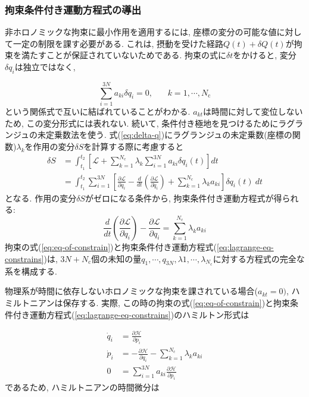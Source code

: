 \subsubsection{拘束条件付き運動方程式の導出}
非ホロノミックな拘束に最小作用を適用するには, 座標の変分の可能な値に対して一定の制限を課す必要がある. これは, 摂動を受けた経路$Q(t) + \delta Q(t)$が拘束を満たすことが保証されていないためである. 
拘束の式に$\delta t$をかけると, 変分$\delta q_{i}$は独立ではなく, 

\begin{equation}
  \sum_{i = 1}^{3N} a_{ki} \delta q_{i} = 0, ~~~~~~~~ k = 1,\cdots, N_{\mathrm{c}}
  \label{eq:delta-q}
\end{equation}
という関係式で互いに結ばれていることがわかる. 
$a_{kt}$は時間に対して変位しないため, この変分形式には表れない. 
続いて, 条件付き極地を見つけるためにラグランジュの未定乗数法を使う. 
式(\ref{eq:delta-q})にラグランジュの未定乗数(座標の関数)$\lambda_{k}$を作用の変分$\delta S$を計算する際に考慮すると
\begin{align}
  \delta S
  &=
  \int_{t_1}^{t_2}
  \left[ \mathcal{L} +
         \sum_{k=1}^{N_{\mathrm{c}}}
         \lambda_{k} \sum_{i = 1}^{3N} a_{ki} \delta q_{i}(t)
  \right] dt
  \\
  &=
  \int_{t_1}^{t_2}
  \sum_{i=1}^{3N}
  \left[
         \frac{\partial \mathcal{L}}{\partial q_{i}}
       - \frac{d}{dt} \left( \frac{\partial \mathcal{L}}{\partial \dot{q}_{i}}\right)
       + \sum_{k=1}^{N_{\mathrm{c}}} \lambda_{k} a_{ki}
  \right] \delta q_{i}(t) ~dt
\end{align}
となる. 作用の変分$\delta S$がゼロになる条件から, 拘束条件付き運動方程式が得られる:
\begin{equation}
  \frac{d}{dt} \left( \frac{\partial \mathcal{L}}{\partial \dot{q}_{i}}\right)
 -\frac{\partial \mathcal{L}}{\partial q_{i}}
 =
 \sum_{k=1}^{N_{\mathrm{c}}} \lambda_{k} a_{ki}
\label{eq:lagrange-eq-constrains}
\end{equation}
拘束の式(\ref{eq:eq-of-constrain})と拘束条件付き運動方程式(\ref{eq:lagrange-eq-constrains})は, $3N+N_{\mathrm{c}}$個の未知の量$q_{1},\cdots,q_{3N}, \lambda{1}, \cdots, \lambda_{N_{\mathrm{c}}}$に対する方程式の完全な系を構成する. 

物理系が時間に依存しないホロノミックな拘束を課されている場合($a_{kt} = 0)$, ハミルトニアンは保存する. 実際, この時の拘束の式(\ref{eq:eq-of-constrain})と拘束条件付き運動方程式(\ref{eq:lagrange-eq-constrains})のハミルトン形式は

\begin{align}
  \dot{q}_{i} &=  \frac{\partial \mathcal{H}}{\partial p_{i}}
  \\
  \dot{p}_{i} &= -\frac{\partial \mathcal{H}}{\partial q_{i}}
                 -\sum_{k=1}^{N_{\mathrm{c}}} \lambda_{k} a_{ki}
  \\
  0 &= \sum_{i=1}^{3N} a_{ki} \frac{\partial \mathcal{H}}{\partial p_{i}}
\end{align}
であるため, ハミルトニアンの時間微分は

